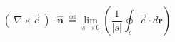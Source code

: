 \begin{equation}
    (~\nabla \times \vec{e}~) \cdot \mathbf{\hat{n}} \
        \overset{\underset{\mathrm{def}}{}}{=}
    \lim_{s \to 0}\left( \frac{1}{|s|}\oint_{c} \vec{e} \cdot d\mathbf{r}\right)
\end{equation}
